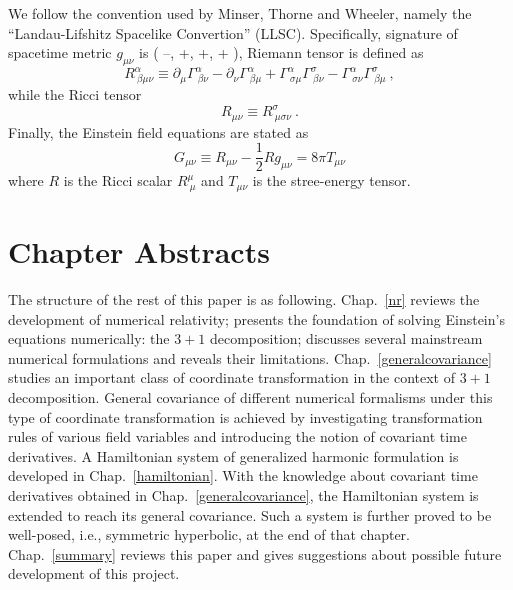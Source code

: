 We follow the convention used by Minser, Thorne and Wheeler\cite{Misner:1974qy}, namely the ``Landau-Lifshitz Spacelike Convertion'' (LLSC). Specifically, signature of spacetime metric $g_{\mu\nu}$ is ( --, +, +, + ), Riemann tensor is defined as 
\begin{equation}
	R^{\alpha}_{~\beta \mu \nu} \equiv 
	\partial_{\mu}\Gamma^{\alpha}_{~\beta \nu} - 
	\partial_{\nu}\Gamma^{\alpha}_{~\beta \mu} + \Gamma^{\alpha}_{~\sigma \mu}\Gamma^{\sigma}_{~\beta \nu} - \Gamma^{\alpha}_{~\sigma \nu}\Gamma^{\sigma}_{~\beta\mu} \ , 
\end{equation}
while the Ricci tensor 
\begin{equation}
	R_{\mu\nu} \equiv R^{\sigma}_{~\mu\sigma\nu} \ . 
\end{equation}
Finally, the Einstein field equations are stated as 
\begin{equation}
	G_{\mu\nu} \equiv R_{\mu\nu} - \frac{1}{2} R g_{\mu\nu} = 8\pi T_{\mu\nu} 
\end{equation}
where $R$ is the Ricci scalar $R^{\mu}_{~\mu}$ and $T_{\mu\nu}$ is the stree-energy tensor. 

\section{Chapter Abstracts}\label{abstracts}
The structure of the rest of this paper is as following. Chap.~\ref{nr} reviews the development of numerical relativity; presents the foundation of solving Einstein's equations numerically: the $3 + 1$ decomposition; discusses several mainstream numerical formulations and reveals their limitations. Chap.~\ref{generalcovariance} studies an important class of coordinate transformation in the context of $3 + 1$ decomposition. General covariance of different numerical formalisms under this type of coordinate transformation is achieved by investigating transformation rules of various field variables and introducing the notion of covariant time derivatives. A Hamiltonian system of generalized harmonic formulation is developed in Chap.~\ref{hamiltonian}. With the knowledge about covariant time derivatives obtained in Chap.~\ref{generalcovariance}, the Hamiltonian system is extended to reach its general covariance. Such a system is further proved to be well-posed, i.e., symmetric hyperbolic, at the end of that chapter. Chap.~\ref{summary} reviews this paper and gives suggestions about possible future development of this project. 
